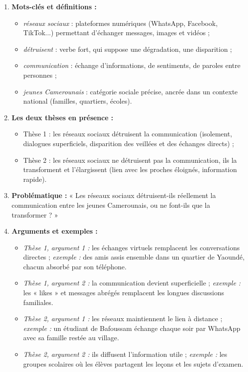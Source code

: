\documentclass[11pt]{article}
\begin{document}
\begin{corrige}
\begin{enumerate}
\item \textbf{Mots-clés et définitions :}
\begin{itemize}
\item \emph{réseaux sociaux} : plateformes numériques (WhatsApp, Facebook, TikTok...) permettant d'échanger messages, images et vidéos ;
\item \emph{détruisent} : verbe fort, qui suppose une dégradation, une disparition ;
\item \emph{communication} : échange d'informations, de sentiments, de paroles entre personnes ;
\item \emph{jeunes Camerounais} : catégorie sociale précise, ancrée dans un contexte national (familles, quartiers, écoles).
\end{itemize}
\item \textbf{Les deux thèses en présence :}
\begin{itemize}
\item Thèse 1 : les réseaux sociaux détruisent la communication (isolement, dialogues superficiels, disparition des veillées et des échanges directs) ;
\item Thèse 2 : les réseaux sociaux ne détruisent pas la communication, ils la transforment et l'élargissent (lien avec les proches éloignés, information rapide).
\end{itemize}
\item \textbf{Problématique :} « Les réseaux sociaux détruisent-ils réellement la communication entre les jeunes Camerounais, ou ne font-ils que la transformer ? »
\item \textbf{Arguments et exemples :}
\begin{itemize}
\item \emph{Thèse 1, argument 1 :} les échanges virtuels remplacent les conversations directes ; \emph{exemple :} des amis assis ensemble dans un quartier de Yaoundé, chacun absorbé par son téléphone.
\item \emph{Thèse 1, argument 2 :} la communication devient superficielle ; \emph{exemple :} les « likes » et messages abrégés remplacent les longues discussions familiales.
\item \emph{Thèse 2, argument 1 :} les réseaux maintiennent le lien à distance ; \emph{exemple :} un étudiant de Bafoussam échange chaque soir par WhatsApp avec sa famille restée au village.
\item \emph{Thèse 2, argument 2 :} ils diffusent l'information utile ; \emph{exemple :} les groupes scolaires où les élèves partagent les leçons et les sujets d'examen.
\end{itemize}
\end{enumerate}
\end{corrige}
\end{document}
